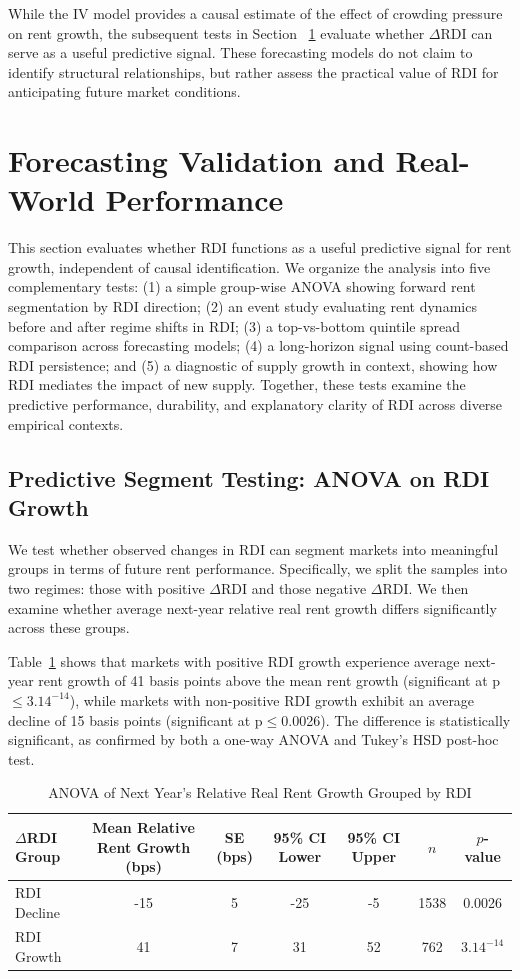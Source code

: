 \documentclass[APA,Times1COL]{WileyNJDv5} %
\begin{document}
While the IV model provides a causal estimate of the effect of crowding pressure on rent growth, the subsequent tests in Section ~\ref{forecasting-validation} evaluate whether \(\Delta \text{RDI}\) can serve as a useful predictive signal. These forecasting models do not claim to identify structural relationships, but rather assess the practical value of RDI for anticipating future market conditions.




\section{Forecasting Validation and Real-World Performance}
\label{forecasting-validation}
This section evaluates whether RDI functions as a useful predictive signal for rent growth, independent of causal identification. We organize the analysis into five complementary tests: (1) a simple group-wise ANOVA showing forward rent segmentation by RDI direction; (2) an event study evaluating rent dynamics before and after regime shifts in RDI; (3) a top-vs-bottom quintile spread comparison across forecasting models; (4) a long-horizon signal using count-based RDI persistence; and (5) a diagnostic of supply growth in context, showing how RDI mediates the impact of new supply. Together, these tests examine the predictive performance, durability, and explanatory clarity of RDI across diverse empirical contexts.

\subsection{Predictive Segment Testing: ANOVA on RDI Growth}
We test whether observed changes in RDI can segment markets into meaningful groups in terms of future rent performance. Specifically, we split the samples into two regimes: those with positive $\Delta$RDI and those negative $\Delta$RDI. We then examine whether average next-year relative real rent growth differs significantly across these groups.

Table~\ref{tab:anova-results} shows that markets with positive RDI growth experience average next-year rent growth of 41 basis points above the mean rent growth (significant at p$\leq 3.14^{-14}$), while markets with non-positive RDI growth exhibit an average decline of 15 basis points (significant at p$\leq$0.0026). The difference is statistically significant, as confirmed by both a one-way ANOVA and Tukey’s HSD post-hoc test.

\begin{table}[h]
	\centering
	\caption{ANOVA of Next Year's Relative Real Rent Growth Grouped by RDI}
	\label{tab:anova-results}
	\begin{tabular}{lcccccc} \toprule
		$\Delta$RDI Group & Mean Relative Rent Growth (bps) & SE (bps) & 95\% CI Lower & 95\% CI Upper & $n$ & $p$-value \\ \midrule
		RDI Decline & -15 & 5 & -25 & -5 & 1538 & 0.0026 \\
		RDI Growth & 41 & 7 & 31 & 52 & 762 & $3.14^{-14}$ \\
		\bottomrule
	\end{tabular}
\end{table}
\end{document}
